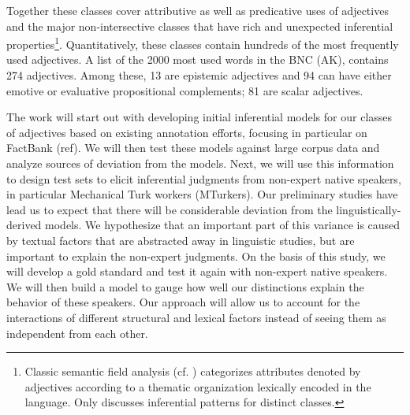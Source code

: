 \documentclass[10pt]{article}
\begin{document}
Together these classes cover attributive as well as predicative uses of adjectives and the major non-intersective classes that have rich and unexpected inferential properties\footnote{Classic semantic field analysis (cf. \cite{dixon:91,lyons:77,raskin1995lexical}) categorizes attributes denoted by adjectives according to a thematic organization lexically encoded in the language. Only \cite{raskin1995lexical} discusses inferential patterns for distinct classes.}. Quantitatively, these classes contain hundreds of the most frequently used adjectives. A list of the 2000 most used words in the BNC (AK), contains 274 adjectives. Among these, 13 are epistemic adjectives and 94 can have either emotive or evaluative propositional complements; 81 are scalar adjectives. 

 
The work will start out with developing initial inferential models for our classes of adjectives based on existing annotation efforts, focusing in particular on FactBank (ref).
We will then test these models against large corpus data and analyze sources of deviation from the models. Next, we will use this information to design test sets to elicit inferential judgments from non-expert native speakers, in particular Mechanical Turk workers (MTurkers). Our preliminary studies have lead us to expect that there will be considerable deviation from the linguistically-derived models. We hypothesize that an important part of this variance is caused by textual factors that are abstracted away in linguistic studies, but are important to explain the non-expert judgments. On the basis of this study, we will develop a gold standard and test it again with non-expert native speakers. We will then build a model to gauge how well our distinctions explain the behavior of these speakers. Our approach will allow us to account for the interactions of different structural and lexical factors instead of seeing them as independent from each other. 
\end{document}
